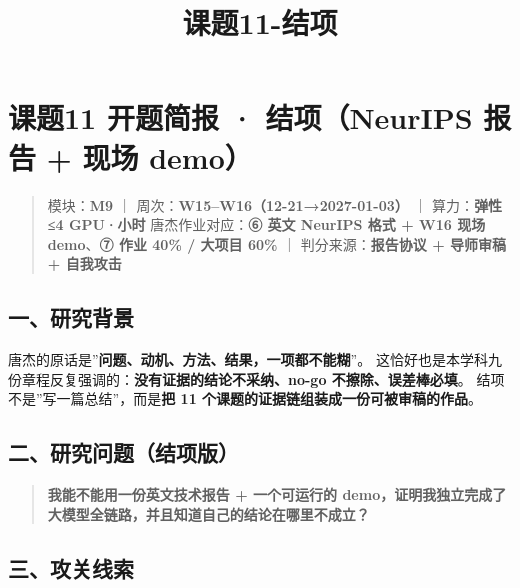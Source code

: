 \documentclass[
  chinese,
  11pt,
]{ctexart}
\title{课题11-结项}
\author{}
\date{}
\begin{document}
\maketitle

{
\setcounter{tocdepth}{2}
\tableofcontents
}
\section{课题11 开题简报 · 结项（NeurIPS 报告 + 现场 demo）}\label{ux8bfeux989811-ux5f00ux9898ux7b80ux62a5-ux7ed3ux9879neurips-ux62a5ux544a-ux73b0ux573a-demo}

\begin{quote}
模块：\textbf{M9} ｜ 周次：\textbf{W15--W16（12-21→2027-01-03）} ｜ 算力：\textbf{弹性 ≤4 GPU·小时} 唐杰作业对应：\textbf{⑥ 英文 NeurIPS 格式 + W16 现场 demo}、\textbf{⑦ 作业 40\% / 大项目 60\%} ｜ 判分来源：\textbf{报告协议 + 导师审稿 + 自我攻击}
\end{quote}

\subsection{一、研究背景}\label{ux4e00ux7814ux7a76ux80ccux666f}

唐杰的原话是''\textbf{问题、动机、方法、结果，一项都不能糊}''。 这恰好也是本学科九份章程反复强调的：\textbf{没有证据的结论不采纳、no-go 不擦除、误差棒必填}。 结项不是''写一篇总结''，而是\textbf{把 11 个课题的证据链组装成一份可被审稿的作品}。

\subsection{二、研究问题（结项版）}\label{ux4e8cux7814ux7a76ux95eeux9898ux7ed3ux9879ux7248}

\begin{quote}
\textbf{我能不能用一份英文技术报告 + 一个可运行的 demo，证明我独立完成了大模型全链路，并且知道自己的结论在哪里不成立？}
\end{quote}

\subsection{三、攻关线索}\label{ux4e09ux653bux5173ux7ebfux7d22}
\end{document}
